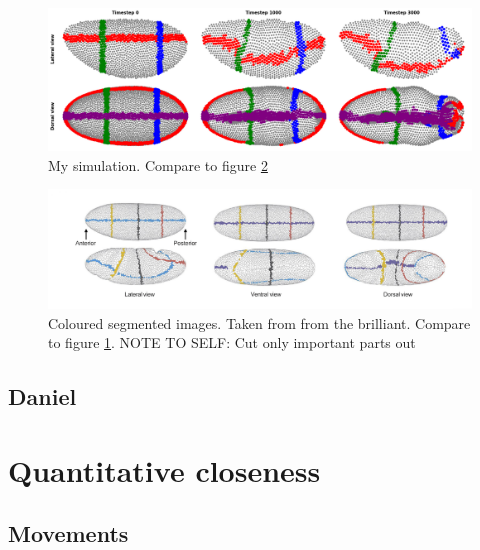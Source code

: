 \begin{figure}[H]
    \centering
    \includegraphics[width=1\linewidth]{chapters/Results/figures/band_movements.png}
    \caption{My simulation. Compare to figure \ref{fig:band-movements-stas}}
    \label{fig:band-movements}
\end{figure}
\begin{figure}[H]
    \centering
    \includegraphics[width=1\linewidth]{chapters/Results/figures/compareStasGBShape.png}
    \caption{Coloured segmented images. Taken from from the brilliant\cite{stern2022deconstructing}. Compare to figure \ref{fig:band-movements}. NOTE TO SELF: Cut only important parts out}
    \label{fig:band-movements-stas}
\end{figure}

\subsection{Daniel}
\section{Quantitative closeness}
\subsection{Movements}

